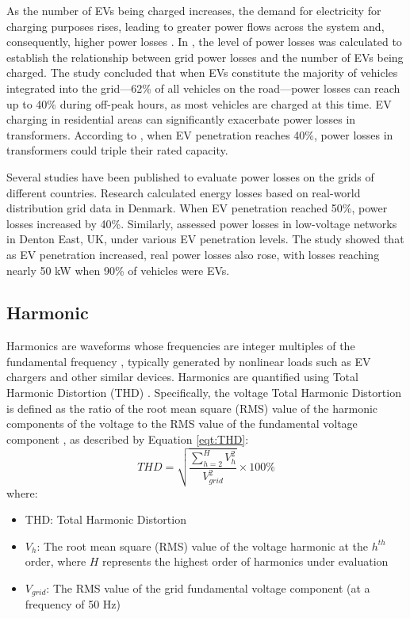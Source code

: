 \documentclass{thesis}
\begin{document}
As the number of EVs being charged increases, the demand for electricity for charging purposes rises, leading to greater power flows across the system and, consequently, higher power losses \cite{69_greenin}. In \cite{70_greenin}, the level of power losses was calculated to establish the relationship between grid power losses and the number of EVs being charged. The study concluded that when EVs constitute the majority of vehicles integrated into the grid—62\% of all vehicles on the road—power losses can reach up to 40\% during off-peak hours, as most vehicles are charged at this time. EV charging in residential areas can significantly exacerbate power losses in transformers. According to \cite{71_greenin}, when EV penetration reaches 40\%, power losses in transformers could triple their rated capacity.

Several studies have been published to evaluate power losses on the grids of different countries. Research \cite{72_greenin} calculated energy losses based on real-world distribution grid data in Denmark. When EV penetration reached 50\%, power losses increased by 40\%. Similarly, \cite{73_greenin} assessed power losses in low-voltage networks in Denton East, UK, under various EV penetration levels. The study showed that as EV penetration increased, real power losses also rose, with losses reaching nearly 50 kW when 90\% of vehicles were EVs.

\subsection{Harmonic}
Harmonics are waveforms whose frequencies are integer multiples of the fundamental frequency \cite{74_greenin}, typically generated by nonlinear loads such as EV chargers and other similar devices. Harmonics are quantified using Total Harmonic Distortion (THD) \cite{75_greenin}. Specifically, the voltage Total Harmonic Distortion is defined as the ratio of the root mean square (RMS) value of the harmonic components of the voltage to the RMS value of the fundamental voltage component \cite{76_greenin}, as described by Equation \eqref{eqt:THD}:
\begin{equation}
    THD = \sqrt{\frac{\sum_{h=2}^{H} V_h^2}{V_{grid}^2}} \times 100\%
    \label{eqt:THD}
\end{equation}
where: 
\begin{itemize}
    \item THD: Total Harmonic Distortion
    \item $V_h$: The root mean square (RMS) value of the voltage harmonic at the $h^{th}$ order, where $H$ represents the highest order of harmonics under evaluation
    \item $V_{grid}$: The RMS value of the grid fundamental voltage component (at a frequency of 50 Hz)
\end{itemize}
\end{document}
